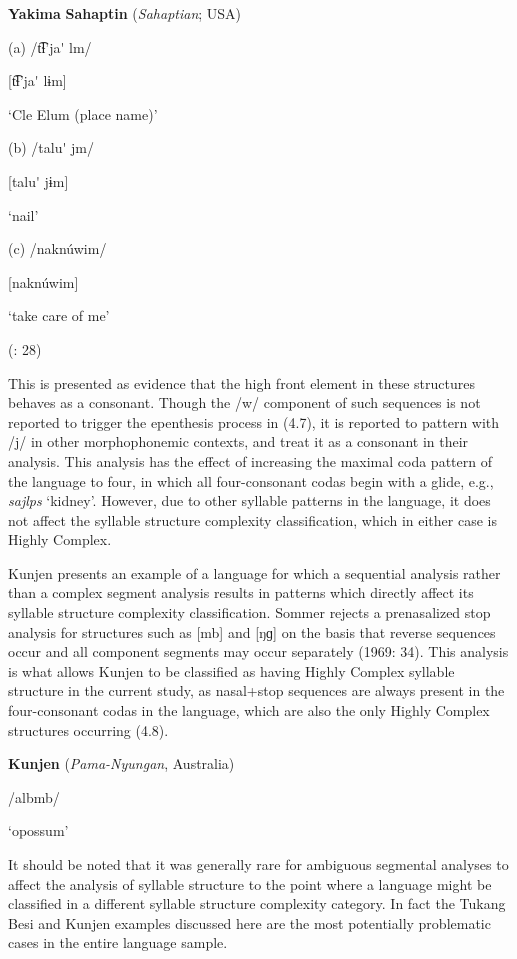 \ea\label{ex:(4.7)}
  \textbf{Yakima} \textbf{Sahaptin} (\textit{Sahaptian}; USA)

(a)  /t͡ɬ’ja\'{} lm/

  [t͡ɬ’ja\'{} lɨm]

  ‘Cle Elum (place name)’

(b)  /talu\'{} jm/

  [talu\'{} jɨm]

  ‘nail’

(c)  /naknúwim/

  [naknúwim]

  ‘take care of me’

(\citealt{HargusBeavert2006}: 28)

\z

This is presented as evidence that the high front element in these structures behaves as a consonant. Though the /w/ component of such sequences is not reported to trigger the epenthesis process in (4.7), it is reported to pattern with /j/ in other morphophonemic contexts, and \citet{HargusBeavert2006} treat it as a consonant in their analysis. This analysis has the effect of increasing the maximal coda pattern of the language to four, in which all four-consonant codas begin with a glide, e.g., \textit{sajlps} ‘kidney’. However, due to other syllable patterns in the language, it does not affect the syllable structure complexity classification, which in either case is Highly Complex.

  Kunjen presents an example of a language for which a sequential analysis rather than a complex segment analysis results in patterns which directly affect its syllable structure complexity classification. Sommer rejects a prenasalized stop analysis for structures such as [mb] and [ŋɡ] on the basis that reverse sequences occur and all component segments may occur separately (1969: 34). This analysis is what allows Kunjen to be classified as having Highly Complex syllable structure in the current study, as nasal+stop sequences are always present in the four-consonant codas in the language, which are also the only Highly Complex structures occurring (4.8).

\ea\label{ex:(4.8)}
   \textbf{Kunjen} (\textit{Pama-Nyungan}, Australia)

/albmb/

‘opossum’

\citep[33]{Sommer1969}

\z

  It should be noted that it was generally rare for ambiguous segmental analyses to affect the analysis of syllable structure to the point where a language might be classified in a different syllable structure complexity category. In fact the Tukang Besi and Kunjen examples discussed here are the most potentially problematic cases in the entire language sample.

